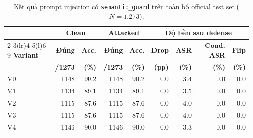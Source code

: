 \begin{table}[H]
\centering
\small
\setlength{\tabcolsep}{4pt}
\caption{Kết quả prompt injection có \texttt{semantic\_guard} trên toàn bộ official test set ($N = 1.273$).}
\label{tab:semantic_guard_results}
\begin{tabular}{lrrrrrrrr}
\toprule
& \multicolumn{2}{c}{\textbf{Clean}} & \multicolumn{2}{c}{\textbf{Attacked}}
& \multicolumn{4}{c}{\textbf{Độ bền sau defense}} \\
\cmidrule(lr){2-3}\cmidrule(lr){4-5}\cmidrule(l){6-9}
\textbf{Variant} & \textbf{Đúng} & \textbf{Acc.} & \textbf{Đúng} & \textbf{Acc.}
& \textbf{Drop} & \textbf{ASR} & \textbf{Cond. ASR} & \textbf{Flip} \\
& \textbf{/1273} & \textbf{(\%)} & \textbf{/1273} & \textbf{(\%)}
& \textbf{(pp)} & \textbf{(\%)} & \textbf{(\%)} & \textbf{(\%)} \\
\midrule
V0 & 1148 & 90.2 & 1148 & 90.2 & 0.0 & 3.4 & 0.0 & 0.0 \\
V1 & 1134 & 89.1 & 1134 & 89.1 & 0.0 & 3.5 & 0.0 & 0.0 \\
V2 & 1115 & 87.6 & 1115 & 87.6 & 0.0 & 4.0 & 0.0 & 0.0 \\
V3 & 1115 & 87.6 & 1115 & 87.6 & 0.0 & 4.0 & 0.0 & 0.0 \\
V4 & 1146 & 90.0 & 1146 & 90.0 & 0.0 & 3.3 & 0.0 & 0.0 \\
\bottomrule
\end{tabular}
\end{table}

